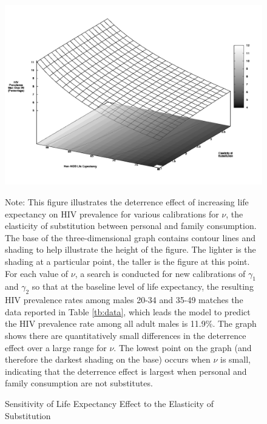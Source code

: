 \documentclass[12pt]{article}
\begin{document}
\begin{figure}
\begin{center}
\caption{Sensitivity of Life Expectancy Effect to the Elasticity of Substitution}\label{fg:lifenu}
\includegraphics[scale=0.33]{images/hiv_lifesub.png} \\
\parbox{5.5in}{\footnotesize{Note: This figure illustrates the deterrence effect of increasing life expectancy on HIV prevalence for various calibrations for $\nu$, the elasticity of substitution between personal and family consumption.  The base of the three-dimensional graph contains contour lines and shading to help illustrate the height of the figure.  The lighter is the shading at a particular point, the taller is the figure at this point.  For each value of $\nu$, a search is conducted for new calibrations of $\gamma_1$ and $\gamma_2$ so that at the baseline level of life expectancy, the resulting HIV prevalence rates among males 20-34 and 35-49 matches the data reported in Table \ref{tb:data}, which leads the model to predict the HIV prevalence rate among all adult males is 11.9\%.  The graph shows there are quantitatively small differences in the deterrence effect over a large range for $\nu$.  The lowest point on the graph (and therefore the darkest shading on the base) occurs when $\nu$ is small, indicating that the deterrence effect is largest when personal and family consumption are not substitutes.}}
\end{center}
\end{figure}
\end{document}
